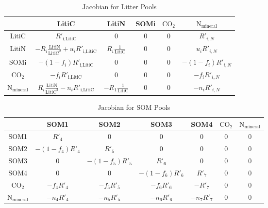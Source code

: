 \documentclass[12pt, a4paper]{article}
\begin{document}
\begin{table}[hb]
\centering
 \caption{Jacobian for Litter Pools} 
\begin{tabular}{ c | ccccc }
                                              &  LitiC  & LitiN & SOMi & $\text{CO}_\text{2}$ & $\text{N}_\text{mineral}$ \\
  \hline
  LitiC                                   & $R'_\text{i,LitiC}$ & 0 & 0 & 0 & $R'_{i,N} $ \\
  LitiN                                   &  $-R_i \frac{\text{LitiN}}{ \text{LitiC}^2}+ u_iR'_\text{i,LitiC} $ & $R_i \frac{1}{ \text{LitiC}} $  &0  & 0 & $u_i R'_{i,N}$  \\
  SOMi                                 & $-(1-f_i)R'_\text{i,LitiC}$ & 0 & 0 & 0 & $-(1-f_i)R'_{i,N} $  \\
  $\text{CO}_\text{2}$         & $-f_iR'_\text{i,LitiC}$ & 0 & 0 & 0 & $-f_iR'_{i,N} $  \\
  $\text{N}_\text{mineral}$ & $R_i \frac{\text{LitiN}}{ \text{LitiC}^2} - n_iR'_\text{i,LitiC} $  & $-R_1 \frac{1}{ \text{LitiC}}$ & 0 & 0 & $-n_i R'_{i,N}$ \\
\end{tabular}
\end{table}

\begin{table}[hb]
\centering
 \caption{Jacobian for SOM Pools} 
\begin{tabular}{ c | cccccc }
                                              &  SOM1  & SOM2 & SOM3 & SOM4 & $\text{CO}_\text{2}$ & $\text{N}_\text{mineral}$ \\
  \hline
  SOM1                                 & $R'_4$ & 0 & 0 & 0 & 0 & 0 \\
  SOM2                                 &  $-(1-f_4)R'_4$ & $R'_5$  &0  & 0 & 0 & 0  \\
  SOM3                                 & 0 & $-(1-f_5)R'_5$ & $R'_6$ & 0 & 0  & 0 \\
  SOM4                                 & 0 & 0 & $-(1-f_6)R'_6$ & $R'_7$ & 0  & 0 \\
  $\text{CO}_\text{2}$         & $-f_4R'_4$ & $-f_5R'_5$ & $-f_6R'_6$  & $-R'_7$ & 0  & 0 \\
  $\text{N}_\text{mineral}$ & $-n_4R'_4$  & $-n_5R'_5$ & $-n_6R'_6$ & $-n_7R'_7$ & 0 & 0 \\
\end{tabular}
\end{table}
\end{document}

